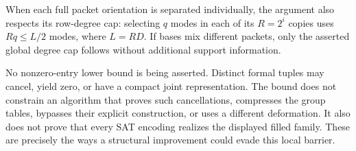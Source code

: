 When each full packet orientation is separated individually, the argument
also respects its row-degree cap: selecting $q$ modes in each of its
$R=2^i$ copies uses $Rq\le L/2$ modes, where $L=RD$.  If bases mix
different packets, only the asserted global degree cap follows without
additional support information.

No nonzero-entry lower bound is being asserted.  Distinct formal tuples
may cancel, yield zero, or have a compact joint representation.  The
bound does not constrain an algorithm that proves such cancellations,
compresses the group tables, bypasses their explicit construction, or
uses a different deformation.  It also does not prove that every SAT
encoding realizes the displayed filled family.  These are precisely the
ways a structural improvement could evade this local barrier.
